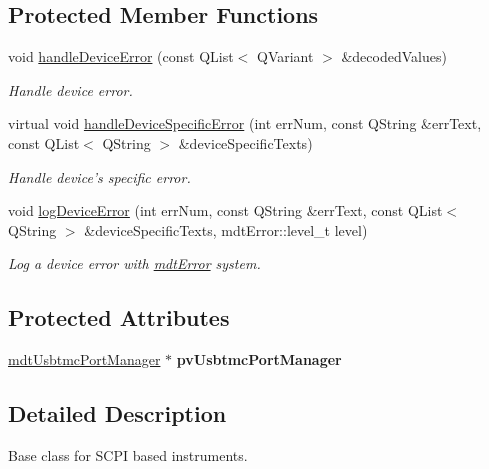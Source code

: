 \subsection*{Protected Member Functions}
\begin{DoxyCompactItemize}
\item 
void \hyperlink{classmdt_device_scpi_a16b6b0c77b1078da285f9d8d9ba52181}{handleDeviceError} (const QList$<$ QVariant $>$ \&decodedValues)
\begin{DoxyCompactList}\small\item\em Handle device error. \end{DoxyCompactList}\item 
virtual void \hyperlink{classmdt_device_scpi_af1cc7d9c99832fa3a7b3c5764588c637}{handleDeviceSpecificError} (int errNum, const QString \&errText, const QList$<$ QString $>$ \&deviceSpecificTexts)
\begin{DoxyCompactList}\small\item\em Handle device's specific error. \end{DoxyCompactList}\item 
void \hyperlink{classmdt_device_scpi_a00d25c16acb20c909210bc5278f713fa}{logDeviceError} (int errNum, const QString \&errText, const QList$<$ QString $>$ \&deviceSpecificTexts, mdtError::level\_\-t level)
\begin{DoxyCompactList}\small\item\em Log a device error with \hyperlink{classmdt_error}{mdtError} system. \end{DoxyCompactList}\end{DoxyCompactItemize}
\subsection*{Protected Attributes}
\begin{DoxyCompactItemize}
\item 
\hypertarget{classmdt_device_scpi_a6f7bd859a14eddbaab64f492777c1337}{
\hyperlink{classmdt_usbtmc_port_manager}{mdtUsbtmcPortManager} $\ast$ {\bfseries pvUsbtmcPortManager}}
\label{classmdt_device_scpi_a6f7bd859a14eddbaab64f492777c1337}

\end{DoxyCompactItemize}


\subsection{Detailed Description}
Base class for SCPI based instruments. 

